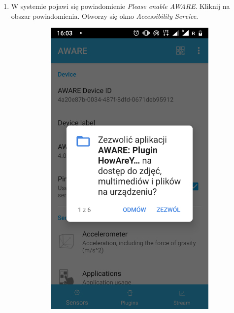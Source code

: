 \begin{enumerate}
	\item W systemie pojawi się powiadomienie \textit{Please enable AWARE}. Kliknij na obszar powiadomienia. Otworzy się okno \textit{Accessibility Service}.
	
	\begin{figure}[H]
		\centering
		\begin{subfigure}{0.35\textwidth}
			\centering
			\includegraphics[scale=0.14]{dodatekA/3_5.png}
			\subcaption{\label{subfigure_a}}
		\end{subfigure}

\end{figure}
\end{enumerate}

